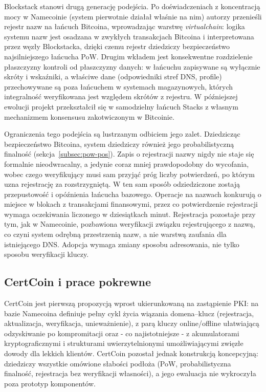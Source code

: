 Blockstack \cite{ali2016blockstack} stanowi drugą generację podejścia. Po doświadczeniach z koncentracją mocy w Namecoinie (system pierwotnie działał właśnie na nim) autorzy przenieśli rejestr nazw na łańcuch Bitcoina, wprowadzając warstwę \emph{virtualchain}: logika systemu nazw jest osadzana w zwykłych transakcjach Bitcoina i interpretowana przez węzły Blockstacka, dzięki czemu rejestr dziedziczy bezpieczeństwo najsilniejszego łańcucha PoW. Drugim wkładem jest konsekwentne rozdzielenie płaszczyzny kontroli od płaszczyzny danych: w łańcuchu zapisywane są wyłącznie skróty i wskaźniki, a właściwe dane (odpowiedniki stref DNS, profile) przechowywane są poza łańcuchem w systemach magazynowych, których integralność weryfikowana jest względem skrótów z rejestru. W późniejszej ewolucji projekt przekształcił się w samodzielny łańcuch Stacks z własnym mechanizmem konsensusu zakotwiczonym w Bitcoinie.

Ograniczenia tego podejścia są lustrzanym odbiciem jego zalet. Dziedzicząc bezpieczeństwo Bitcoina, system dziedziczy również jego probabilistyczną finalność (sekcja~\ref{subsec:pow-pos}). Zapis o rejestracji nazwy nigdy nie staje się formalnie nieodwracalny, a jedynie coraz mniej prawdopodobny do wycofania, wobec czego weryfikujący musi sam przyjąć próg liczby potwierdzeń, po którym uzna rejestrację za rozstrzygniętą. W ten sam sposób odziedziczone zostają przepustowość i opóźnienia łańcucha bazowego. Operacje na nazwach konkurują o miejsce w blokach z transakcjami finansowymi, przez co potwierdzenie rejestracji wymaga oczekiwania liczonego w dziesiątkach minut. Rejestracja pozostaje przy tym, jak w Namecoinie, pozbawiona weryfikacji związku rejestrującego z nazwą, co czyni system odrębną przestrzenią nazw, a nie warstwą zaufania dla istniejącego DNS. Adopcja wymaga zmiany sposobu adresowania, nie tylko sposobu weryfikacji kluczy.

\subsection{CertCoin i prace pokrewne}
\label{subsec:certcoin}

CertCoin \cite{fromknecht2014certcoin} jest pierwszą propozycją wprost ukierunkowaną na zastąpienie PKI: na bazie Namecoina definiuje pełny cykl życia wiązania domena--klucz (rejestracja, aktualizacja, weryfikacja, unieważnienie), z parą kluczy online/offline ułatwiającą odzyskiwanie po kompromitacji oraz - co najistotniejsze - z akumulatorami kryptograficznymi i strukturami uwierzytelnionymi umożliwiającymi zwięzłe dowody dla lekkich klientów. CertCoin pozostał jednak konstrukcją koncepcyjną: dziedziczy wszystkie omówione słabości podłoża (PoW, probabilistyczna finalność, rejestracja bez weryfikacji własności), a jego ewaluacja nie wykroczyła poza prototyp komponentów.

